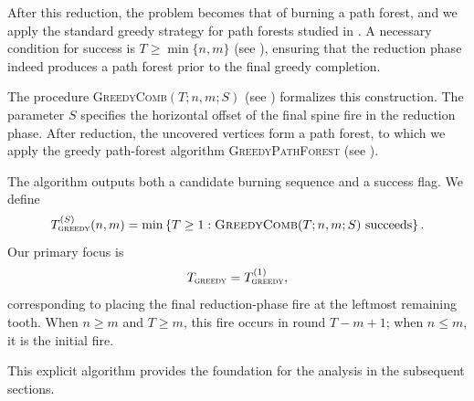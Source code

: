 \documentclass{article}
\newcommand{\gr}{\textsc{greedy}}
\begin{document}
After this reduction, the problem becomes that of burning a path forest, and we apply the standard greedy strategy for path forests studied in \cite{bonato2019bounds}. A necessary condition for success is $T \ge \min\{n,m\}$ (see ), ensuring that the reduction phase indeed produces a path forest prior to the final greedy completion.

The procedure \textsc{GreedyComb}$(T;n,m;S)$ (see ) formalizes this construction. The parameter $S$ specifies the horizontal offset of the final spine fire in the reduction phase. After reduction, the uncovered vertices form a path forest, to which we apply the greedy path-forest algorithm \textsc{GreedyPathForest} (see ).

The algorithm outputs both a candidate burning sequence and a success flag. We define
\[
T_\gr^{(S)}(n,m)
=
\min\left\{T \ge 1 :
\textsc{GreedyComb}(T;n,m;S) \text{ succeeds}\right\}.
\]
Our primary focus is
\[
T_\gr = T_\gr^{(1)},
\]
corresponding to placing the final reduction-phase fire at the leftmost remaining tooth. When $n \ge m$ and $T \ge m$, this fire occurs in round $T-m+1$; when $n \le m$, it is the initial fire.

This explicit algorithm provides the foundation for the analysis in the subsequent sections.
\end{document}
